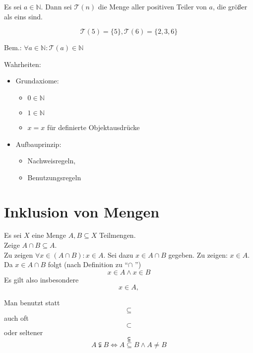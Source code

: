 \documentclass[a4paper, parskip = true, fleqn, headsepline = true]{scrartcl}
\newcommand{\qed}{\tag{$\square$}}
\DeclareRobustCommand{\qed}{%
	\ifmmode \tag*{$\square$}%
	\else \leavevmode\unskip\penalty9999 \hbox{}\nobreak\hfill\quad\hbox{$\square$}%
	\fi%
}
\newcommand{\N}{\mathbb{N}}
\begin{document}
\begin{definition}[Teilermenge]
	\label{def:Teilermenge}
	Es sei $ a \in \mathbb{N} $. Dann sei $ \mathcal{T}(n) $ die Menge aller positiven Teiler von $ a $, die größer als eins sind.
	\begin{example}
		\[ \mathcal{T}(5) = \{5\}, \mathcal{T}(6) = \{2, 3, 6\} \]
	\end{example}
	Bem.: $ \forall a \in \mathbb{N} : \mathcal{T}(a) \in \mathbb{N} $
\end{definition}

Wahrheiten:
\begin{itemize}
	\item Grundaxiome:
		\begin{itemize}
			\item $ 0 \in \N $
			\item $ 1 \in \N $
			\item $ x = x $ für definierte Objektausdrücke
		\end{itemize}
	\item Aufbauprinzip:
		\begin{itemize}
			\item Nachweisregeln,
			\item Benutzungsregeln
		\end{itemize}
\end{itemize}



\section{Inklusion von Mengen}

\begin{example}
	Es sei $ X $ eine Menge $ A, B \subseteq X $ Teilmengen.\\
	Zeige $ A \cap B \subseteq A $.\\
	Zu zeigen $ \forall x \in ( A \cap B ) : x \in A $. Sei dazu $ x \in A \cap B $ gegeben. Zu zeigen: $ x \in A $. Da $ x \in A \cap B $ folgt (nach Definition zu ``$ \cap $ '')
	\[ x \in A \wedge x \in B \]
	Es gilt also insbesondere
	\[ x \in A, \qed \]
\end{example}

\begin{important}
	Man benutzt statt
	\[ \subseteq \]
	auch oft
	\[ \subset \]
	oder seltener
	\[ \subseteqq \]
	\[ A \subsetneqq B \iff A \subseteq B \wedge A \neq B \]
\end{important}
\end{document}
